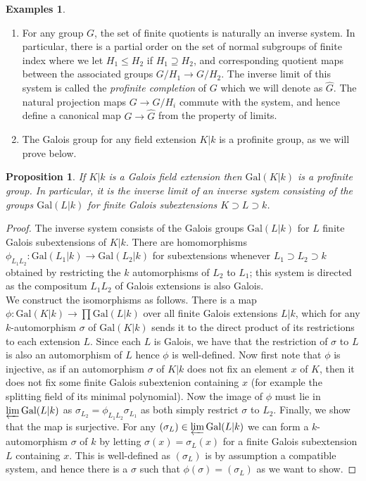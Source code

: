 \documentclass{article}
\theoremstyle{definition}
\newtheorem{examples}[theorem]{Examples}
\theoremstyle{remark}
\theoremstyle{plain}
\newtheorem{proposition}[theorem]{Proposition}
\begin{document}
\begin{examples} \text{}
\begin{enumerate}
	\item For any group $G$, the set of finite quotients is naturally an inverse system.
		In particular, there is a partial order on the set of normal subgroups of finite index where we let $H_1 \leq H_2$ if $H_1 \supseteq H_2$, and corresponding quotient maps between the associated groups $G/H_1 \to G/H_2$.
		The inverse limit of this system is called the \textit{profinite completion} of $G$ which we will denote as $\widehat{G}$.	
		The natural projection maps $G \to G/H_i$ commute with the system, and hence define a canonical map $G \to \widehat{G}$ from the property of limits.
	\item The Galois group for any field extension $K|k$ is a profinite group, as we will prove below.
		\end{enumerate}
\end{examples}


\begin{proposition}
	If $K|k$ is a Galois field extension then $\text{Gal}(K|k)$ is a profinite group.
	In particular, it is the inverse limit of an inverse system consisting of the groups $\text{Gal}(L|k)$ for finite Galois subextensions $K \supset L \supset k$.
\end{proposition}
\begin{proof}
	The inverse system consists of the Galois groups $\text{Gal}(L|k)$ for $L$ finite Galois subextensions of $K|k$.
	There are homomorphisms $\phi_{L_1L_2}: \text{Gal}(L_1|k) \to \text{Gal}(L_2|k)$ for subextensions whenever $L_1 \supset L_2 \supset k$ obtained by restricting the $k$ automorphisms of $L_2$ to $L_1$; this system is directed as the compositum $L_1 L_2$ of Galois extensions is also Galois.\\
\indent We construct the isomorphisms as follows.
There is a map $\phi: \text{Gal}(K|k) \to \prod \text{Gal}(L|k)$ over all finite Galois extensions $L|k$, which for any $k$-automorphism $\sigma$ of $\text{Gal}(K|k)$ sends it to the direct product of its restrictions to each extension $L$.
Since each $L$ is Galois, we have that the restriction of $\sigma$ to $L$ is also an automorphism of $L$ hence $\phi$ is well-defined.
Now first note that $\phi$ is injective, as if an automorphism $\sigma$ of $K|k$ does not fix an element $x$ of $K$, then it does not fix some finite Galois subextenion containing $x$ (for example the splitting field of its minimal polynomial).
Now the image of $\phi$ must lie in $\varprojlim \text{Gal}(L|k)$ as  $\sigma_{L_2} = \phi_{L_1 L_2} \sigma_{L_1}$ as both simply restrict $\sigma$ to $L_2$.
Finally, we show that the map is surjective.
For any $(\sigma_L) \in \varprojlim \text{Gal}(L|k)$ we can form a $k$-automorphism  $\sigma$ of $k$ by letting $\sigma(x) = \sigma_L(x)$ for a finite Galois subextension $L$ containing $x$. 
This is well-defined as $(\sigma_L)$ is by assumption a compatible system, and hence there is a $\sigma$ such that $\phi(\sigma) = (\sigma_L)$ as we want to show.
\end{proof}
\end{document}
